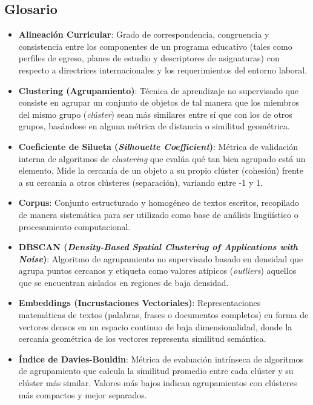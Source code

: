 \subsection{Glosario}

\begin{itemize}
    \item \textbf{Alineación Curricular}: Grado de correspondencia, congruencia y consistencia entre los componentes de un programa educativo (tales como perfiles de egreso, planes de estudio y descriptores de asignaturas) con respecto a directrices internacionales y los requerimientos del entorno laboral.
    
    \item \textbf{Clustering (Agrupamiento)}: Técnica de aprendizaje no supervisado que consiste en agrupar un conjunto de objetos de tal manera que los miembros del mismo grupo (\textit{clúster}) sean más similares entre sí que con los de otros grupos, basándose en alguna métrica de distancia o similitud geométrica.
    
    \item \textbf{Coeficiente de Silueta (\textit{Silhouette Coefficient})}: Métrica de validación interna de algoritmos de \textit{clustering} que evalúa qué tan bien agrupado está un elemento. Mide la cercanía de un objeto a su propio clúster (cohesión) frente a su cercanía a otros clústeres (separación), variando entre -1 y 1.
    
    \item \textbf{Corpus}: Conjunto estructurado y homogéneo de textos escritos, recopilado de manera sistemática para ser utilizado como base de análisis lingüístico o procesamiento computacional.
    
    \item \textbf{DBSCAN (\textit{Density-Based Spatial Clustering of Applications with Noise})}: Algoritmo de agrupamiento no supervisado basado en densidad que agrupa puntos cercanos y etiqueta como valores atípicos (\textit{outliers}) aquellos que se encuentran aislados en regiones de baja densidad.
    
    \item \textbf{Embeddings (Incrustaciones Vectoriales)}: Representaciones matemáticas de textos (palabras, frases o documentos completos) en forma de vectores densos en un espacio continuo de baja dimensionalidad, donde la cercanía geométrica de los vectores representa similitud semántica.
    
    \item \textbf{Índice de Davies-Bouldin}: Métrica de evaluación intrínseca de algoritmos de agrupamiento que calcula la similitud promedio entre cada clúster y su clúster más similar. Valores más bajos indican agrupamientos con clústeres más compactos y mejor separados.
    

\end{itemize}
